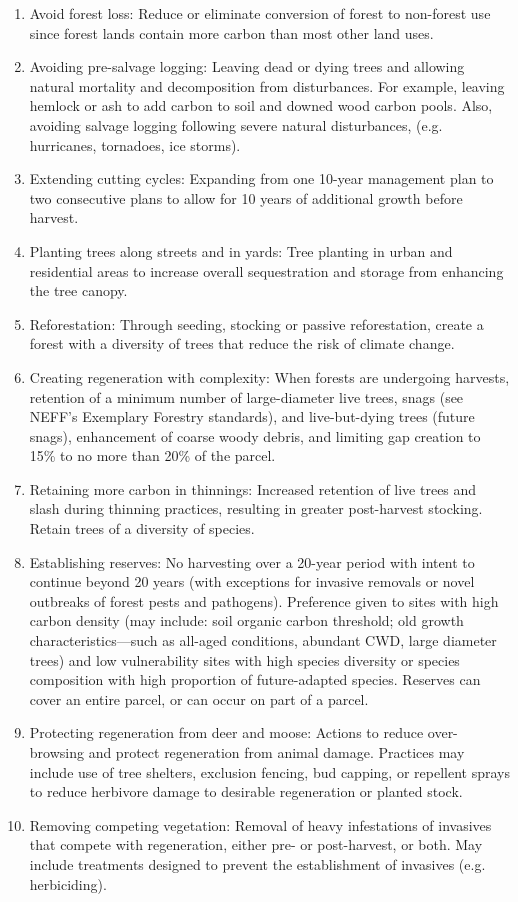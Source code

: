 \documentclass{article}\usepackage[]{graphicx}\usepackage[]{color}
\begin{document}
\begin{itemize}
    \begin{enumerate}
    \item Avoid forest loss: Reduce or eliminate conversion of forest to non-forest use since forest lands contain more carbon than most other land uses.
    \item Avoiding pre-salvage logging: Leaving dead or dying trees and allowing natural mortality and decomposition from disturbances. For example, leaving hemlock or ash to add carbon to soil and downed wood carbon pools. Also, avoiding salvage logging following severe natural disturbances, (e.g. hurricanes, tornadoes, ice storms). 
    \item Extending cutting cycles: Expanding from one 10-year management plan to two consecutive plans to allow for 10 years of additional growth before harvest.
    \item Planting trees along streets and in yards: Tree planting in urban and residential areas to increase overall sequestration and storage from enhancing the tree canopy. 
    \item Reforestation: Through seeding, stocking or passive reforestation, create a forest with a diversity of trees that reduce the risk of climate change.
    \item Creating regeneration with complexity: When forests are undergoing harvests, retention of a minimum number of large-diameter live trees, snags (see NEFF's Exemplary Forestry standards), and live-but-dying trees (future snags), enhancement of coarse woody debris, and limiting gap creation to 15\% to no more than 20\% of the parcel.
    \item Retaining more carbon in thinnings: Increased retention of live trees and slash during thinning practices, resulting in greater post-harvest stocking. Retain trees of a diversity of species.
    \item Establishing reserves: No harvesting over a 20-year period with intent to continue beyond 20 years (with exceptions for invasive removals or novel outbreaks of forest pests and pathogens). Preference given to sites with high carbon density (may include: soil organic carbon threshold; old growth characteristics---such as all-aged conditions, abundant CWD, large diameter trees) and low vulnerability sites with high species diversity or species composition with high proportion of future-adapted species. Reserves can cover an entire parcel, or can occur on part of a parcel. 
    \item Protecting regeneration from deer and moose: Actions to reduce over-browsing and protect regeneration from animal damage. Practices may include use of tree shelters, exclusion fencing, bud capping, or repellent sprays to reduce herbivore damage to desirable regeneration or planted stock. 
    \item Removing competing vegetation: Removal of heavy infestations of invasives that compete with regeneration, either pre- or post-harvest, or both. May include treatments designed to prevent the establishment of invasives (e.g. herbiciding).
    \end{enumerate}


\end{itemize}
\end{document}
